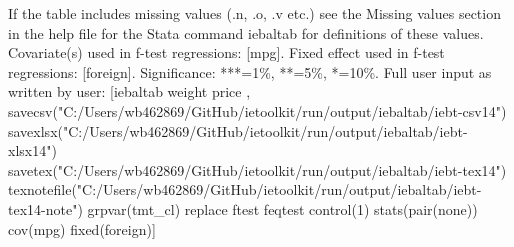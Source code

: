 If the table includes missing values (.n, .o, .v etc.) see the Missing values section in the help file for the Stata command iebaltab for definitions of these values. Covariate(s) used in f-test regressions: [mpg]. Fixed effect used in f-test regressions: [foreign]. Significance: ***=1\%, **=5\%, *=10\%. Full user input as written by user: [iebaltab weight price , savecsv("C:/Users/wb462869/GitHub/ietoolkit/run/output/iebaltab/iebt-csv14") savexlsx("C:/Users/wb462869/GitHub/ietoolkit/run/output/iebaltab/iebt-xlsx14") savetex("C:/Users/wb462869/GitHub/ietoolkit/run/output/iebaltab/iebt-tex14") texnotefile("C:/Users/wb462869/GitHub/ietoolkit/run/output/iebaltab/iebt-tex14-note") grpvar(tmt\_cl) replace ftest feqtest control(1) stats(pair(none)) cov(mpg) fixed(foreign)]
